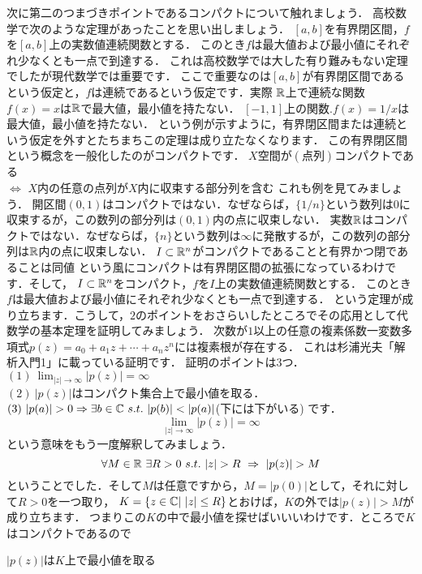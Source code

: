 次に第二のつまづきポイントであるコンパクトについて触れましょう．
高校数学で次のような定理があったことを思い出しましょう．
\thm[最大値最小値の定理]
$[a,b]$を有界閉区間，$f$を$[a,b]$上の実数値連続関数とする．
このとき$f$は最大値および最小値にそれぞれ少なくとも一点で到達する．
\thmx
これは高校数学では大した有り難みもない定理でしたが現代数学では重要です．
ここで重要なのは$[a,b]$が有界閉区間であるという仮定と，$f$は連続であるという仮定です．実際
\ex[非有界]
$\mathbb R$上で連続な関数$f(x)=x$は$\mathbb R$で最大値，最小値を持たない．
\exx
\ex[不連続]
$[-1,1]$上の関数.$f(x)=1/x$は最大値，最小値を持たない．
\exx
という例が示すように，有界閉区間または連続という仮定を外すとたちまちこの定理は成り立たなくなります．
この有界閉区間という概念を一般化したのがコンパクトです．
$X$空間が$(点列)$コンパクトである\\
$\iff$
$X$内の任意の点列が$X$内に収束する部分列を含む
これも例を見てみましょう．
\ex
開区間$(0,1)$はコンパクトではない．なぜならば，$\{1/n\}$という数列は$0$に収束するが，この数列の部分列は$(0,1)$内の点に収束しない．
\exx
\ex
実数$\mathbb R$はコンパクトではない．なぜならば，$\{n\}$という数列は$\infty$に発散するが，この数列の部分列は$\mathbb R$内の点に収束しない．
\exx
\thm
$I \subset \mathbb R^n$がコンパクトであることと有界かつ閉であることは同値
\thmx
という風にコンパクトは有界閉区間の拡張になっているわけです．そして，
\thm
$I \subset \mathbb R^n$をコンパクト，$f$を$I$上の実数値連続関数とする．
このとき$f$は最大値および最小値にそれぞれ少なくとも一点で到達する．
\thmx
という定理が成り立ちます．こうして，$2$のポイントをおさらいしたところでその応用として代数学の基本定理を証明してみましょう．
\thm[代数学の基本定理]
次数が$1$以上の任意の複素係数一変数多項式$p(z)=a_0+a_1 z+\cdots + a_nz^n$には複素根が存在する．
\thmx
\proof[初等解析による証明]
これは杉浦光夫「解析入門1」に載っている証明です．
証明のポイントは3つ．\\
$(1)\ \lim_{|z|\to\infty}|p(z)| = \infty$\\
$(2)\ |p(z)|$はコンパクト集合上で最小値を取る．\\
$(3)\ |p(a)|>0 \Rightarrow \exists b \in \C \ s.t. \ |p(b)| < |p(a)|$(下には下がいる)
です．
\[
\lim_{|z|\to\infty}|p(z)| = \infty
\]
という意味をもう一度解釈してみましょう．
\[
\forall M \in \R \ \exists R>0 \ s.t. \  |z| > R \ \Rightarrow\  |p(z)|>M
\]
ということでした．そして$M$は任意ですから，$M=|p(0)|$として，それに対して$R>0$を一つ取り，
$K=\{ z\in\mathbb C |\ |z|\le R\}$とおけば，$K$の外では$|p(z)|>M$が成り立ちます．
つまりこの$K$の中で最小値を探せばいいいわけです．ところで$K$はコンパクトであるので
\begin{center}
$|p(z)|$は$K$上で最小値を取る
\end{center}
